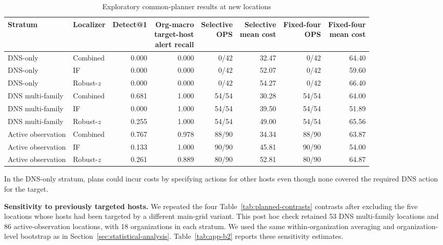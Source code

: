 \documentclass[sn-basic]{sn-jnl}%
\theoremstyle{thmstyleone}%
\theoremstyle{thmstyletwo}%
\theoremstyle{thmstylethree}%
\begin{document}
\begin{appendices}
\begin{table}
\centering
\caption{Exploratory common-planner results at new locations}
\label{tab:app-b1}
\small
\setlength{\tabcolsep}{3pt}
\renewcommand{\arraystretch}{1.1}
\begin{tabular*}{\linewidth}{@{\extracolsep{\fill}}llrrrrrr@{}}
\toprule
Stratum & Localizer & Detect@1 & \shortstack{Org-macro\\target-host\\alert recall} & \shortstack{Selective\\OPS} & \shortstack{Selective\\mean cost} & \shortstack{Fixed-four\\OPS} & \shortstack{Fixed-four\\mean cost} \\
\midrule
DNS-only & Combined & 0.000 & 0.000 & 0/42 & 32.47 & 0/42 & 64.40 \\
DNS-only & IF & 0.000 & 0.000 & 0/42 & 52.07 & 0/42 & 59.60 \\
DNS-only & Robust-\(z\) & 0.000 & 0.000 & 0/42 & 54.27 & 0/42 & 66.40 \\
\addlinespace
DNS multi-family & Combined & 0.681 & 1.000 & 54/54 & 30.28 & 54/54 & 64.00 \\
DNS multi-family & IF & 0.000 & 1.000 & 54/54 & 39.50 & 54/54 & 51.89 \\
DNS multi-family & Robust-\(z\) & 0.255 & 1.000 & 54/54 & 49.00 & 54/54 & 65.56 \\
\addlinespace
Active observation & Combined & 0.767 & 0.978 & 88/90 & 34.34 & 88/90 & 63.87 \\
Active observation & IF & 0.133 & 1.000 & 90/90 & 45.81 & 90/90 & 54.00 \\
Active observation & Robust-\(z\) & 0.261 & 0.889 & 80/90 & 52.81 & 80/90 & 64.87 \\
\bottomrule
\end{tabular*}
\end{table}

In the DNS-only stratum, plans could incur costs by specifying actions for other hosts even though none covered the required DNS action for the target.

\textbf{Sensitivity to previously targeted hosts.} We repeated the four Table~\ref{tab:planned-contrasts} contrasts after excluding the five locations whose hosts had been targeted by a different main-grid variant. This post hoc check retained 53 DNS multi-family locations and 86 active-observation locations, with 18 organizations in each stratum. We used the same within-organization averaging and organization-level bootstrap as in Section~\ref{sec:statistical-analysis}. Table~\ref{tab:app-b2} reports these sensitivity estimates.


\end{appendices}
\end{document}
